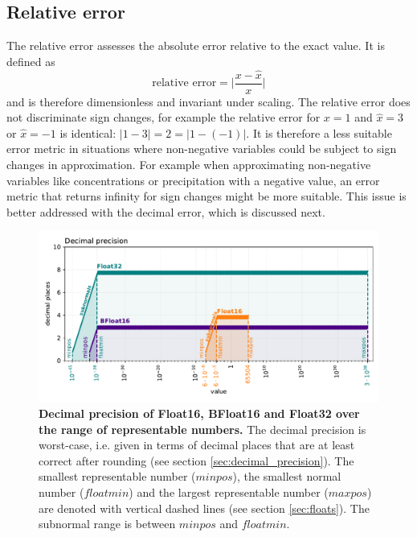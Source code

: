 \subsection{Relative error}
\label{sec:relative_error}

The relative error assesses the absolute error relative to the exact value. It is defined as
\begin{equation}
	\text{relative error} = \vert \frac{x - \hat{x}}{x} \vert
	\label{eq:relerror}
\end{equation}
and is therefore dimensionless and invariant under scaling. The relative error does not discriminate sign changes, for example
the relative error for $x=1$ and $\hat{x} = 3$ or $\hat{x} = -1$ is identical: $\vert 1- 3 \vert = 2 = \vert 1 - (-1) \vert$. It is therefore
a less suitable error metric in situations where non-negative variables could be subject to sign changes in approximation.
For example when approximating non-negative variables like concentrations or precipitation with a negative value,
an error metric that returns infinity for sign changes might be more suitable. This issue is better addressed with
the decimal error, which is discussed next.

\begin{figure}[tbhp]
	\includegraphics[width=1\textwidth]{Figures/methods/float32_16_bfloat_decprec.pdf}
	\caption{\textbf{Decimal precision of Float16, BFloat16 and Float32 over the range of representable numbers.}
	The decimal precision is worst-case, i.e. given in terms of decimal places that are at least correct after rounding
	(see section \ref{sec:decimal_precision}). The smallest representable number ($minpos$), the smallest normal number
	($floatmin$) and the largest representable number ($maxpos$) are denoted with vertical dashed lines (see section \ref{sec:floats}).
	The subnormal range is between $minpos$ and $floatmin$.}
	\label{fig:methods_decprec_floats}
\end{figure}

